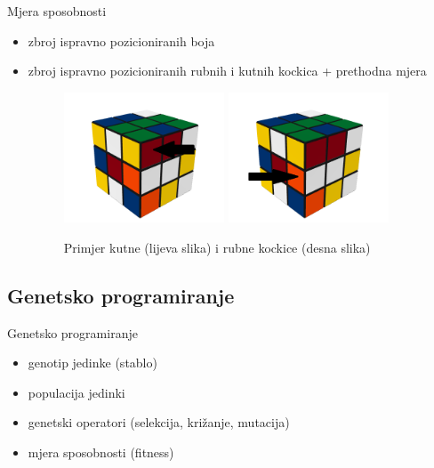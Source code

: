 \documentclass{beamer}
\begin{document}
  \begin{frame}{Mjera sposobnosti}
	\begin{itemize}[<+- | alert@+>]
		\item zbroj ispravno pozicioniranih boja
		\item{ zbroj ispravno pozicioniranih rubnih i kutnih kockica + prethodna mjera 
	  	\begin{figure}[h]
		\centering
		\includegraphics[width=0.45\textwidth]{../image/corner_cubie.png}
		\includegraphics[width=0.45\textwidth]{../image/edge_cubie.png}
		\caption{Primjer kutne (lijeva slika) i rubne kockice (desna slika) }
  		\end{figure} }
  	\end{itemize}
  \end{frame}

  \subsection{Genetsko programiranje}
  
  \begin{frame}{Genetsko programiranje}
  	\begin{itemize}[<+- | alert@+>]
		\item genotip jedinke (stablo)
		\item populacija jedinki
		\item genetski operatori (selekcija, križanje, mutacija)
		\item mjera sposobnosti (fitness)
	\end{itemize}
  \end{frame}
  
\end{document}
